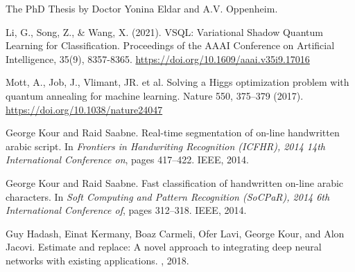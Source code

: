 \documentclass{article}
\begin{document}
The PhD
Thesis by Doctor Yonina Eldar and A.V. Oppenheim.

  


\begin{thebibliography}{1}


Li, G., Song, Z., \& Wang, X. (2021). 
VSQL: Variational Shadow Quantum Learning for Classification. 
Proceedings of the AAAI Conference on Artificial Intelligence, 35(9), 8357-8365. \url{https://doi.org/10.1609/aaai.v35i9.17016}

Mott, A., Job, J., Vlimant, JR. et al. Solving a Higgs optimization problem with 
quantum annealing for machine learning. Nature 550, 375–379 (2017). \url{https://doi.org/10.1038/nature24047}

George Kour and Raid Saabne.
\newblock Real-time segmentation of on-line handwritten arabic script.
\newblock In {\em Frontiers in Handwriting Recognition (ICFHR), 2014 14th
  International Conference on}, pages 417--422. IEEE, 2014.

George Kour and Raid Saabne.
\newblock Fast classification of handwritten on-line arabic characters.
\newblock In {\em Soft Computing and Pattern Recognition (SoCPaR), 2014 6th
  International Conference of}, pages 312--318. IEEE, 2014.

Guy Hadash, Einat Kermany, Boaz Carmeli, Ofer Lavi, George Kour, and Alon
  Jacovi.
\newblock Estimate and replace: A novel approach to integrating deep neural
  networks with existing applications.
, 2018.

\end{thebibliography}
\end{document}
